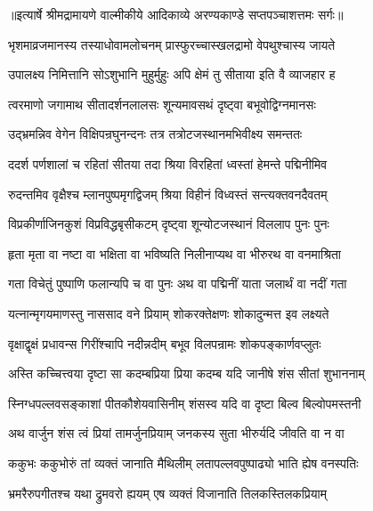{॥इत्यार्षे श्रीमद्रामायणे वाल्मीकीये आदिकाव्ये अरण्यकाण्डे सप्तपञ्चाशत्तमः सर्गः॥}


\twolineshloka
{भृशमाव्रजमानस्य तस्याधोवामलोचनम्}
{प्रास्फुरच्चास्खलद्रामो वेपथुश्चास्य जायते} %

\twolineshloka
{उपालक्ष्य निमित्तानि सोऽशुभानि मुहुर्मुहुः}
{अपि क्षेमं तु सीताया इति वै व्याजहार ह} %

\twolineshloka
{त्वरमाणो जगामाथ सीतादर्शनलालसः}
{शून्यमावसथं दृष्ट्वा बभूवोद्विग्नमानसः} %

\twolineshloka
{उद्भ्रमन्निव वेगेन विक्षिपन्रघुनन्दनः}
{तत्र तत्रोटजस्थानमभिवीक्ष्य समन्ततः} %

\twolineshloka
{ददर्श पर्णशालां च रहितां सीतया तदा}
{श्रिया विरहितां ध्वस्तां हेमन्ते पद्मिनीमिव} %

\twolineshloka
{रुदन्तमिव वृक्षैश्च म्लानपुष्पमृगद्विजम्}
{श्रिया विहीनं विध्वस्तं सन्त्यक्तवनदैवतम्} %

\twolineshloka
{विप्रकीर्णाजिनकुशं विप्रविद्धबृसीकटम्}
{दृष्ट्वा शून्योटजस्थानं विललाप पुनः पुनः} %

\twolineshloka
{हृता मृता वा नष्टा वा भक्षिता वा भविष्यति}
{निलीनाप्यथ वा भीरुरथ वा वनमाश्रिता} %

\twolineshloka
{गता विचेतुं पुष्पाणि फलान्यपि च वा पुनः}
{अथ वा पद्मिनीं याता जलार्थं वा नदीं गता} %

\twolineshloka
{यत्नान्मृगयमाणस्तु नाससाद वने प्रियाम्}
{शोकरक्तेक्षणः शोकादुन्मत्त इव लक्ष्यते} %

\twolineshloka
{वृक्षाद्वृक्षं प्रधावन्स गिरींश्चापि नदीन्नदीम्}
{बभूव विलपन्रामः शोकपङ्कार्णवप्लुतः} %

\twolineshloka
{अस्ति कच्चित्त्वया दृष्टा सा कदम्बप्रिया प्रिया}
{कदम्ब यदि जानीषे शंस सीतां शुभाननाम्} %

\twolineshloka
{स्निग्धपल्लवसङ्काशां पीतकौशेयवासिनीम्}
{शंसस्व यदि वा दृष्टा बिल्व बिल्वोपमस्तनी} %

\twolineshloka
{अथ वार्जुन शंस त्वं प्रियां तामर्जुनप्रियाम्}
{जनकस्य सुता भीरुर्यदि जीवति वा न वा} %

\twolineshloka
{ककुभः ककुभोरुं तां व्यक्तं जानाति मैथिलीम्}
{लतापल्लवपुष्पाढ्यो भाति ह्येष वनस्पतिः} %

\twolineshloka
{भ्रमरैरुपगीतश्च यथा द्रुमवरो ह्ययम्}
{एष व्यक्तं विजानाति तिलकस्तिलकप्रियाम्} %

